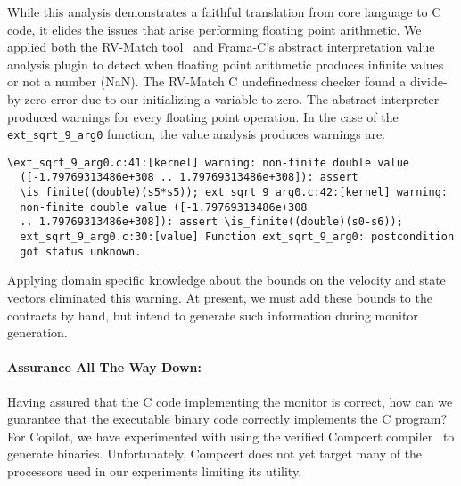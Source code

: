 While this analysis demonstrates a faithful translation from
core language to C code, it elides the issues that arise performing
floating point arithmetic.  We applied both the RV-Match
tool~\cite{RV-Match} and Frama-C's abstract interpretation value
analysis plugin to detect when floating point arithmetic produces
infinite values or not a number (NaN).  The RV-Match C undefinedness
checker found a divide-by-zero error due to our initializing a
variable to zero.  The abstract interpreter produced warnings for
every floating point operation. In the case of the
\texttt{ext\_sqrt\_9\_arg0} function, the value analysis produces
warnings are: 
\begin{Verbatim}[fontsize=\scriptsize]
  \ext_sqrt_9_arg0.c:41:[kernel] warning: non-finite double value
  ([-1.79769313486e+308 .. 1.79769313486e+308]): assert
  \is_finite((double)(s5*s5)); ext_sqrt_9_arg0.c:42:[kernel] warning:
  non-finite double value ([-1.79769313486e+308
  .. 1.79769313486e+308]): assert \is_finite((double)(s0-s6));
  ext_sqrt_9_arg0.c:30:[value] Function ext_sqrt_9_arg0: postcondition
  got status unknown.
\end{Verbatim}
Applying domain specific knowledge about  the  bounds on the velocity and state
vectors  eliminated this
warning.  At present, we must add these bounds to the
contracts by hand, but intend to generate  such
information during monitor generation.  

\paragraph{Assurance All The Way Down:} 
Having assured that the C code implementing the monitor is correct,
how can we guarantee that the executable binary code correctly
implements the C program?  For Copilot, we have experimented
with using the verified Compcert compiler~\cite{leroy} to generate
binaries.  Unfortunately, Compcert does not yet target many of the
processors used in our experiments limiting its utility.




